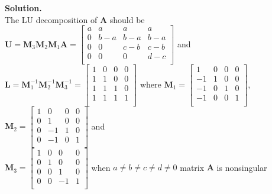 \documentclass[english,onecolumn]{IEEEtran}
\begin{document}
\noindent \textbf{Solution.}\\

The LU decomposition of $\mathbf{A}$ should be
$\mathbf{U}=\mathbf{M}_{3}\mathbf{M}_{2}\mathbf{M}_{1}\mathbf{A}=\begin{bmatrix}
a & a & a & a\\
0 & b-a & b-a & b-a\\
0 & 0 & c-b & c-b\\
0 & 0 & 0 & d-c\\
\end{bmatrix}$
and\\ $\mathbf{L}=\mathbf{M}_{1}^{-1}\mathbf{M}_{2}^{-1}\mathbf{M}_{3}^{-1}=
\begin{bmatrix}
1 & 0 & 0 & 0\\
1 & 1 & 0 & 0\\
1 & 1 & 1 & 0\\
1 & 1 & 1 & 1\\
\end{bmatrix}
$
where 
$\mathbf{M}_{1}=
\begin{bmatrix}
1 & 0 & 0 & 0\\
-1 & 1 & 0 & 0\\
-1 & 0 & 1 & 0\\
-1 & 0 & 0 & 1\\
\end{bmatrix}
$,\quad
$\mathbf{M}_{2}=
\begin{bmatrix}
1 & 0 & 0 & 0\\
0 & 1 & 0 & 0\\
0 & -1 & 1 & 0\\
0 & -1 & 0 & 1\\
\end{bmatrix}
$ \quad and \\
$\mathbf{M}_{3}=
\begin{bmatrix}
1 & 0 & 0 & 0\\
0 & 1 & 0 & 0\\
0 & 0 & 1 & 0\\
0 & 0 & -1 & 1\\
\end{bmatrix}
$
when $a\ne b \ne c \ne d \ne 0$ matrix $\mathbf{A}$ is nonsingular
\end{document}
